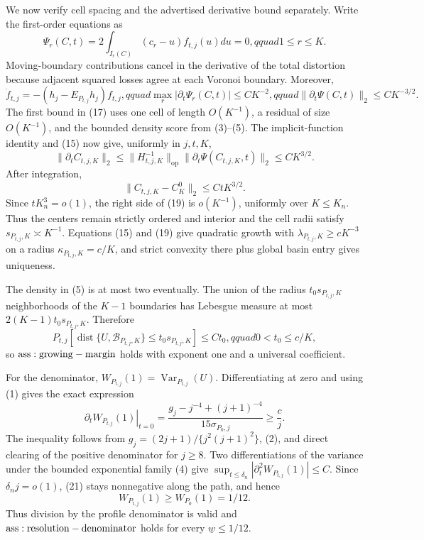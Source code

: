 We now verify cell spacing and the advertised derivative bound separately.  Write the first-order equations as
\[
 \Psi_r(C,t)=2\int_{I_r(C)}(c_r-u)f_{t,j}(u)du=0,qquad 1\leq r\leq K.                   \tag{16}
\]
Moving-boundary contributions cancel in the derivative of the total distortion because adjacent squared losses agree at each Voronoi boundary.  Moreover,
\[
 \dot f_{t,j}=-(h_j-E_{P_{t,j}}h_j)f_{t,j},qquad
 \max_r|\partial_t\Psi_r(C,t)|\leq CK^{-2},qquad
 \|\partial_t\Psi(C,t)\|_2\leq CK^{-3/2}.                                             \tag{17}
\]
The first bound in (17) uses one cell of length \(O(K^{-1})\), a residual of size \(O(K^{-1})\), and the bounded density score from (3)--(5).  The implicit-function identity and (15) now give, uniformly in \(j,t,K\),
\[
 \|\partial_t C_{t,j,K}\|_2
 \leq\|H_{t,j,K}^{-1}\|_{\mathrm{op}}\|\partial_t\Psi(C_{t,j,K},t)\|_2
 \leq CK^{3/2}.                                                                         \tag{18}
\]
After integration,
\[
 \|C_{t,j,K}-C_K^0\|_2\leq CtK^{3/2}.                                                  \tag{19}
\]
Since \(tK_n^3=o(1)\), the right side of (19) is \(o(K^{-1})\), uniformly over \(K\leq K_n\).  Thus the centers remain strictly ordered and interior and the cell radii satisfy \(s_{P_{t,j},K}\asymp K^{-1}\).  Equations (15) and (19) give quadratic growth with \(\lambda_{P_{t,j},K}\geq cK^{-3}\) on a radius \(\kappa_{P_{t,j},K}=c/K\), and strict convexity there plus global basin entry gives uniqueness.

The density in (5) is at most two eventually.  The union of the radius \(t_0s_{P_{t,j},K}\) neighborhoods of the \(K-1\) boundaries has Lebesgue measure at most \(2(K-1)t_0s_{P_{t,j},K}\).  Therefore
\[
 P_{t,j}\!\left[\operatorname{dist}\{U,\mathcal B_{P_{t,j},K}\}
 \leq t_0s_{P_{t,j},K}\right]\leq Ct_0,qquad 0<t_0\leq c/K,                           \tag{20}
\]
so \({\rm ass:growing-margin}\) holds with exponent one and a universal coefficient.

For the denominator, \(W_{P_{t,j}}(1)=\operatorname{Var}_{P_{t,j}}(U)\).  Differentiating at zero and using (1) gives the exact expression
\[
 \left.\partial_tW_{P_{t,j}}(1)\right|_{t=0}
 =\frac{g_j-j^{-4}+(j+1)^{-4}}{15\sigma_{P_0,j}}\geq\frac{c}{j}.                         \tag{21}
\]
The inequality follows from \(g_j=(2j+1)/\{j^2(j+1)^2\}\), (2), and direct clearing of the positive denominator for \(j\geq8\).  Two differentiations of the variance under the bounded exponential family (4) give \(\sup_{t\leq\delta_n}|\partial_t^2W_{P_{t,j}}(1)|\leq C\).  Since \(\delta_nj=o(1)\), (21) stays nonnegative along the path, and hence
\[
 W_{P_{t,j}}(1)\geq W_{P_0}(1)=1/12.                                                     \tag{22}
\]
Thus division by the profile denominator is valid and \({\rm ass:resolution-denominator}\) holds for every \(\underline w\leq1/12\).

